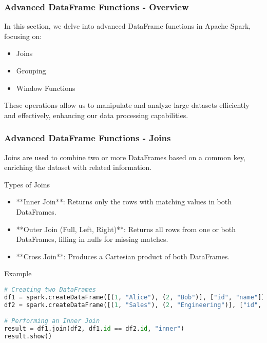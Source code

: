 \documentclass[aspectratio=169]{beamer}
\begin{document}
\begin{frame}[fragile]
    \frametitle{Advanced DataFrame Functions - Overview}
    In this section, we delve into advanced DataFrame functions in Apache Spark, focusing on:
    \begin{itemize}
        \item Joins
        \item Grouping
        \item Window Functions
    \end{itemize}
    These operations allow us to manipulate and analyze large datasets efficiently and effectively, enhancing our data processing capabilities.
\end{frame}

\begin{frame}[fragile]
    \frametitle{Advanced DataFrame Functions - Joins}
    Joins are used to combine two or more DataFrames based on a common key, enriching the dataset with related information.

    \begin{block}{Types of Joins}
        \begin{itemize}
            \item **Inner Join**: Returns only the rows with matching values in both DataFrames.
            \item **Outer Join (Full, Left, Right)**: Returns all rows from one or both DataFrames, filling in nulls for missing matches.
            \item **Cross Join**: Produces a Cartesian product of both DataFrames.
        \end{itemize}
    \end{block}

    \begin{block}{Example}
    \begin{lstlisting}[language=Python]
# Creating two DataFrames
df1 = spark.createDataFrame([(1, "Alice"), (2, "Bob")], ["id", "name"])
df2 = spark.createDataFrame([(1, "Sales"), (2, "Engineering")], ["id", "department"])

# Performing an Inner Join
result = df1.join(df2, df1.id == df2.id, "inner")
result.show()
    \end{lstlisting}
    \end{block}
\end{frame}
\end{document}
